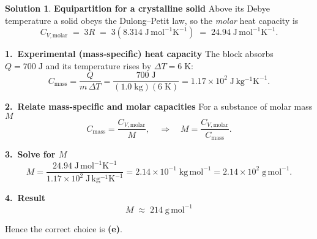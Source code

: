 \documentclass[12pt]{article}
\theoremstyle{definition} %
\newtheorem{solution}{Solution}
\theoremstyle{plain} %
\begin{document}
                                \begin{solution}
                                  \textbf{Equipartition for a crystalline solid}  
                                  Above its Debye temperature a solid obeys the Dulong–Petit law, so the
                                  \emph{molar} heat capacity is
                                  \[
                                  C_{V,\mathrm{molar}} \;=\; 3R
                                             \;=\; 3(8.314\;\mathrm{J\,mol^{-1}K^{-1}})
                                             \;=\; 24.94\;\mathrm{J\,mol^{-1}K^{-1}}.
                                  \]
                                  
                                  \textbf{1.\  Experimental (mass‐specific) heat capacity}  
                                  The block absorbs \(Q = 700\;\mathrm{J}\) and its temperature rises by
                                  \(\Delta T = 6\;\mathrm{K}\):
                                  \[
                                  C_{\mathrm{mass}}
                                    = \frac{Q}{m\,\Delta T}
                                    = \frac{700\;\mathrm{J}}{(1.0\;\mathrm{kg})(6\;\mathrm{K})}
                                    = 1.17\times10^{2}\;\mathrm{J\,kg^{-1}K^{-1}}.
                                  \]
                                  
                                  \textbf{2.\  Relate mass‐specific and molar capacities}  
                                  For a substance of molar mass \(M\)
                                  \[
                                  C_{\mathrm{mass}}
                                    = \frac{C_{V,\mathrm{molar}}}{M},
                                  \quad\Longrightarrow\quad
                                  M
                                    = \frac{C_{V,\mathrm{molar}}}{C_{\mathrm{mass}}}.
                                  \]
                                  
                                  \textbf{3.\  Solve for \(M\)}  
                                  \[
                                  M
                                    = \frac{24.94\;\mathrm{J\,mol^{-1}K^{-1}}}
                                           {1.17\times10^{2}\;\mathrm{J\,kg^{-1}K^{-1}}}
                                      = 2.14\times10^{-1}\;\mathrm{kg\,mol^{-1}}
                                      = 2.14\times10^{2}\;\mathrm{g\,mol^{-1}}.
                                  \]
                                  
                                  \textbf{4.\  Result}  
                                  \[
                                  \boxed{M \;\approx\; 214\;\mathrm{g\,mol^{-1}}}
                                  \]
                                  
                                  Hence the correct choice is \textbf{(e)}.
                                  \end{solution}
\end{document}
